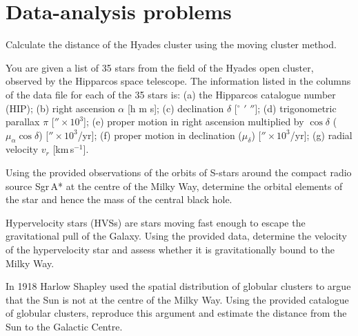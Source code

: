 \section*{Data-analysis problems}

Calculate the distance of the Hyades cluster using the moving cluster method.

You are given a list of 35 stars from the field of the Hyades open cluster,
observed by the Hipparcos space telescope. The information listed in the columns
of the data file for each of the 35 stars is: (a) the Hipparcos catalogue number
(HIP); (b) right ascension $\alpha$ [h m s]; (c) declination $\delta$
[$^\circ$ $'$ $''$]; (d) trigonometric parallax $\pi$ [$'' \times 10^3$];
(e) proper motion in right ascension multiplied by $\cos\delta$
($\mu_\alpha\cos\delta$) [$'' \times 10^3$/yr]; (f) proper motion in
declination ($\mu_\delta$) [$'' \times 10^3$/yr]; (g) radial velocity $v_r$
[km\,s$^{-1}$].

Using the provided observations of the orbits of S-stars around the compact radio
source Sgr\,A* at the centre of the Milky Way, determine the orbital elements of
the star and hence the mass of the central black hole.

Hypervelocity stars (HVSs) are stars moving fast enough to escape the
gravitational pull of the Galaxy. Using the provided data, determine the velocity
of the hypervelocity star and assess whether it is gravitationally bound to the
Milky Way.

In 1918 Harlow Shapley used the spatial distribution of globular clusters to
argue that the Sun is not at the centre of the Milky Way. Using the provided
catalogue of globular clusters, reproduce this argument and estimate the distance
from the Sun to the Galactic Centre.

